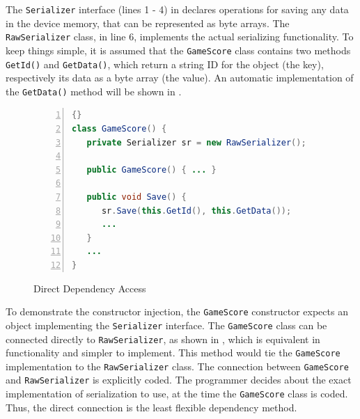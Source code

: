 The \texttt{Se\-ria\-li\-zer} interface (lines 1 - 4) in  declares operations for saving any data in the device memory, that can be represented as byte arrays. The \texttt{Raw\-Se\-ria\-li\-zer} class, in line 6, implements the actual serializing functionality. To keep things simple, it is assumed that the \texttt{Ga\-me\-Sco\-re} class contains two methods \texttt{Get\-Id()} and \texttt{Get\-Da\-ta()}, which return a string ID for the object (the key), respectively its data as a byte array (the value). An automatic implementation of the \texttt{Get\-Da\-ta()} method will be shown in .

\begin{figure}[ht]
	\centering
	\begin{minipage}[b]{8.5cm}
	\begin{center}	
\begin{scriptsize}
\begin{lstlisting}[numbers=left,language=Java,frame=leftline]{}
class GameScore() {
   private Serializer sr = new RawSerializer();
   
   public GameScore() {	...	}
	
   public void Save() {
      sr.Save(this.GetId(), this.GetData());
      ... 
   }
   ...
}	
		\end{lstlisting}
		\end{scriptsize}
	\end{center}
	\caption{Direct Dependency Access}
	\label{c2f:direct}
	\end{minipage}	
\end{figure}

To demonstrate the constructor injection, the \texttt{Ga\-me\-Sco\-re} constructor expects an object implementing the \texttt{Se\-ria\-li\-zer} interface. The \texttt{Ga\-me\-Sco\-re} class can be connected directly to \texttt{RawSerializer}, as shown in , which is equivalent in functionality and simpler to implement. This method would tie the \texttt{Ga\-me\-Sco\-re} implementation to the \texttt{Raw\-Se\-ria\-li\-zer} class. The connection between \texttt{Ga\-me\-Sco\-re} and \texttt{Raw\-Se\-ria\-li\-zer} is explicitly coded. The programmer decides about the exact implementation of serialization to use, at the time the \texttt{Ga\-me\-Sco\-re} class is coded. Thus, the direct connection is the least flexible dependency method.

